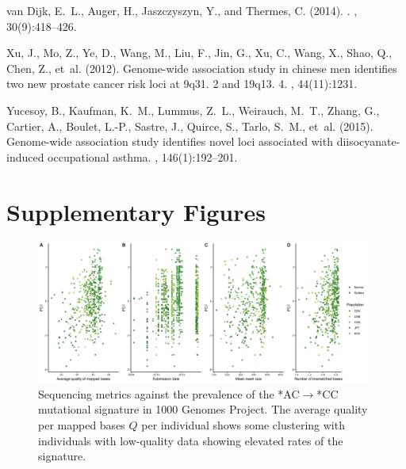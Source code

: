 \documentclass[9pt,article]{template}
\begin{document}
\begin{thebibliography}{}
van Dijk, E.~L., Auger, H., Jaszczyszyn, Y., and Thermes, C. (2014).
.
, 30(9):418--426.

Xu, J., Mo, Z., Ye, D., Wang, M., Liu, F., Jin, G., Xu, C., Wang, X., Shao, Q.,
  Chen, Z., et~al. (2012).
\newblock Genome-wide association study in chinese men identifies two new
  prostate cancer risk loci at 9q31. 2 and 19q13. 4.
, 44(11):1231.

Yucesoy, B., Kaufman, K.~M., Lummus, Z.~L., Weirauch, M.~T., Zhang, G.,
  Cartier, A., Boulet, L.-P., Sastre, J., Quirce, S., Tarlo, S.~M., et~al.
  (2015).
\newblock Genome-wide association study identifies novel loci associated with
  diisocyanate-induced occupational asthma.
, 146(1):192--201.

\end{thebibliography}


\clearpage


\section{Supplementary Figures}
\clearpage


\renewcommand{\thefigure}{S\arabic{figure}}
\setcounter{figure}{0}   	

\begin{figure}[tbp]
\includegraphics[width=11cm,keepaspectratio]{PC1_Correlation.jpg}
\caption{Sequencing metrics against the prevalence of the  *AC${\rightarrow}$*CC mutational signature in 1000 Genomes Project. 
The average quality per mapped bases $Q$ per individual shows some clustering with individuals with low-quality data showing elevated rates of the signature.  }
\label{PC1_Correlation}
\end{figure}
\end{document}
